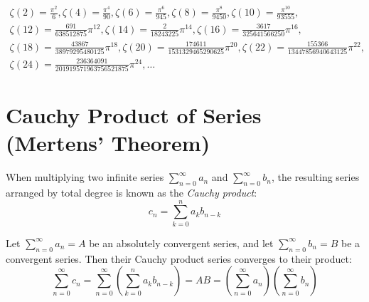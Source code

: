 \documentclass[a4paper]{article}
\begin{document}
\begin{gather*}
    \zeta(2) = \frac{\pi^2}{6},
    \zeta(4) = \frac{\pi^4}{90},
    \zeta(6) = \frac{\pi^6}{945},
    \zeta(8) = \frac{\pi^8}{9450},
    \zeta(10) = \frac{\pi^{10}}{93555},
    \\
    \zeta(12) = \frac{691}{638512875} \pi^{12},
    \zeta(14) = \frac{2}{18243225} \pi^{14},
    \zeta(16) = \frac{3617}{325641566250} \pi^{16},
    \\
    \zeta(18) = \frac{43867}{38979295480125} \pi^{18},
    \zeta(20) = \frac{174611}{1531329465290625} \pi^{20},
    \zeta(22) = \frac{155366}{13447856940643125} \pi^{22},
    \\
    \zeta(24) = \frac{236364091}{201919571963756521875} \pi^{24},
    \dots
\end{gather*}

\pagebreak

\section{Cauchy Product of Series (Mertens' Theorem)}\label{bn:sec:cauchy-product}

When multiplying two infinite series $\sum_{n=0}^{\infty} a_n$ and $\sum_{n=0}^{\infty} b_n$, the resulting series arranged by total degree is known as the \emph{Cauchy product}:
\begin{equation}
    c_n = \sum_{k=0}^{n} a_k b_{n-k}
\end{equation}

\begin{theorem}\label{bn:thm:mertens-cauchy-product}
    Let $\sum_{n=0}^{\infty} a_n = A$ be an absolutely convergent series, and let $\sum_{n=0}^{\infty} b_n = B$ be a convergent series. Then their Cauchy product series converges to their product:
    \begin{equation}
        \sum_{n=0}^{\infty} c_n = \sum_{n=0}^{\infty} \left( \sum_{k=0}^{n} a_k b_{n-k} \right) = A B = \left( \sum_{n=0}^{\infty} a_n \right) \left( \sum_{n=0}^{\infty} b_n \right)
    \end{equation}
\end{theorem}
\end{document}

